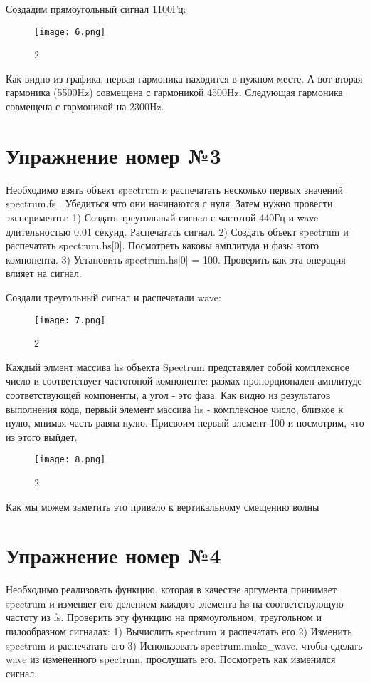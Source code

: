 \documentclass[10pt,a4paper,oneside]{article}
\begin{document}
Создадим прямоугольный сигнал 1100Гц: 

\begin{figure}[H]
        \centering
        \texttt{[image: 6.png]}
        \caption{2}
        \label{fig:first}
\end{figure}

Как видно из графика, первая гармоника находится в нужном месте. А вот вторая гармоника (5500Hz) совмещена с гармоникой 4500Hz. Следующая гармоника совмещена с гармоникой на 2300Hz.

\section{Упражнение номер №3}
Необходимо взять объект spectrum и распечатать несколько первых значений spectrum.fs . Убедиться что они начинаются с нуля. Затем нужно провести эксперименты:
1) Создать треугольный сигнал с частотой 440Гц и wave длительностью 0.01 секунд. Распечатать сигнал.
2) Создать объект spectrum и распечатать spectrum.hs[0]. Посмотреть каковы амплитуда и фазы этого компонента.
3) Установить spectrum.hs[0] = 100. Проверить как эта операция влияет на сигнал. 

Создали треугольный сигнал и распечатали wave:

\begin{figure}[H]
        \centering
        \texttt{[image: 7.png]}
        \caption{2}
        \label{fig:first}
\end{figure}

Каждый элмент массива hs объекта Spectrum представялет собой комплексное число и соответствует частотоной компоненте: размах пропорционален амплитуде соответствующей компоненты, а угол - это фаза. Как видно из результатов выполнения кода, первый элемент массива hs - комплексное число, близкое к нулю, мнимая часть равна нулю. Присвоим первый элемент 100 и посмотрим, что из этого выйдет.

\begin{figure}[H]
        \centering
        \texttt{[image: 8.png]}
        \caption{2}
        \label{fig:first}
\end{figure}

Как мы можем заметить это привело к вертикальному смещению волны

\section{Упражнение номер №4}
Необходимо реализовать функцию, которая в качестве аргумента принимает spectrum и изменяет его делением каждого элемента hs на соответствующую частоту из fs. Проверить эту функцию на прямоугольном, треугольном и пилообразном сигналах:
1) Вычислить spectrum и распечатать его
2) Изменить spectrum и распечатать его
3) Использовать spectrum.make_wave, чтобы сделать wave из измененного spectrum, прослушать его. Посмотреть как изменился сигнал.
\end{document}
